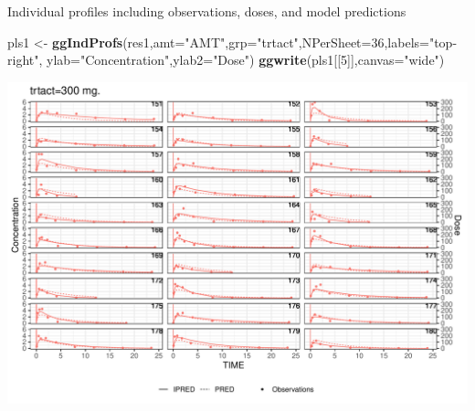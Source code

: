 \documentclass[
  8pt,
  ignorenonframetext,
  aspectratio=169]{beamer}
\newenvironment{Shaded}{\begin{snugshade}}{\end{snugshade}}
\newcommand{\DataTypeTok}[1]{\textcolor[rgb]{0.13,0.29,0.53}{#1}}
\newcommand{\DecValTok}[1]{\textcolor[rgb]{0.00,0.00,0.81}{#1}}
\newcommand{\KeywordTok}[1]{\textcolor[rgb]{0.13,0.29,0.53}{\textbf{#1}}}
\newcommand{\NormalTok}[1]{#1}
\newcommand{\StringTok}[1]{\textcolor[rgb]{0.31,0.60,0.02}{#1}}
\begin{document}
\begin{frame}[fragile]{Individual profiles including observations,
doses, and model predictions}
\protect\hypertarget{individual-profiles-including-observations-doses-and-model-predictions}{}
\footnotesize

\begin{Shaded}
\begin{Highlighting}[]
\NormalTok{pls1 \textless{}{-}}\StringTok{ }\KeywordTok{ggIndProfs}\NormalTok{(res1,}\DataTypeTok{amt=}\StringTok{"AMT"}\NormalTok{,}\DataTypeTok{grp=}\StringTok{"trtact"}\NormalTok{,}\DataTypeTok{NPerSheet=}\DecValTok{36}\NormalTok{,}\DataTypeTok{labels=}\StringTok{"top{-}right"}\NormalTok{,}
                   \DataTypeTok{ylab=}\StringTok{"Concentration"}\NormalTok{,}\DataTypeTok{ylab2=}\StringTok{"Dose"}\NormalTok{)}
\KeywordTok{ggwrite}\NormalTok{(pls1[[}\DecValTok{5}\NormalTok{]],}\DataTypeTok{canvas=}\StringTok{"wide"}\NormalTok{)}
\end{Highlighting}
\end{Shaded}

\begin{center}\includegraphics[height=0.75\textheight]{plots/unnamed-chunk-41-1} \end{center}
\normalsize
\end{frame}
\end{document}
